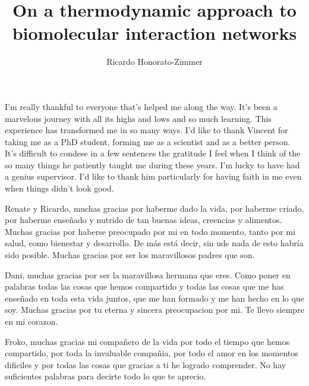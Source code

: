 \documentclass[phd,lfcs]{infthesis}
\title{On a thermodynamic approach to
  biomolecular interaction networks}
\author{Ricardo Honorato-Zimmer}
\begin{document}
\begin{preliminary}

\maketitle

\begin{acknowledgements}
  I'm really thankful to everyone that's helped me along the way.
  It's been a marvelous journey with all its highs and lows
  and so much learning.
  This experience has transformed me in so many ways.
  I'd like to thank Vincent for taking me as a PhD student,
  forming me as a scientist and as a better person.
  It's difficult to condese in a few sentences the gratitude I feel
  when I think of the so many things
  he patiently taught me during these years.
  I'm lucky to have had a genius supervisor.
  I'd like to thank him particularly for having faith in me
  even when things didn't look good.


  Renate y Ricardo, muchas gracias por haberme dado la vida,
  por haberme criado, por haberme enseñado y nutrido
  de tan buenas ideas, creencias y alimentos.
  Muchas gracias por haberse preocupado por mi en todo momento,
  tanto por mi salud, como bienestar y desarrollo.
  De m\'as est\'a decir, sin uds nada de esto habr\'ia sido posible.
  Muchas gracias por ser los maravillosos padres que son.

  Dani, muchas gracias por ser la maravillosa hermana que eres.
  Como poner en palabras todas las cosas que hemos compartido
  y todas las cosas que me has enseñado en toda esta vida juntos,
  que me han formado y me han hecho en lo que soy.
  Muchas gracias por tu eterna y sincera preocupacion por mi.
  Te llevo siempre en mi corazon.

  Froko, muchas gracias mi compañero de la vida
  por todo el tiempo que hemos compartido,
  por toda la invaluable compañia,
  por todo el amor en los momentos dificiles
  y por todas las cosas que gracias a ti he logrado comprender.
  No hay suficientes palabras para decirte todo lo que te aprecio.


\end{acknowledgements}
\end{preliminary}
\end{document}
